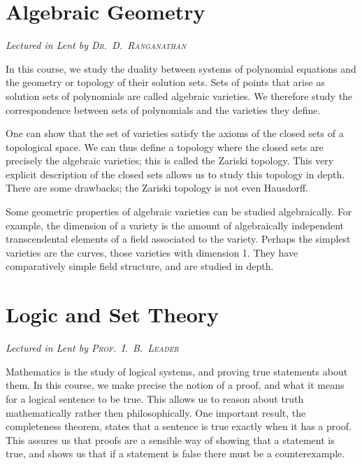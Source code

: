 

\chapter[Algebraic Geometry \\ \textnormal{\emph{Lectured in Lent \oldstylenums{2023} by \textsc{Dr.\ D.\ Ranganathan}}}]{Algebraic Geometry}
\emph{\Large Lectured in Lent  by \textsc{Dr.\ D.\ Ranganathan}}

In this course, we study the duality between systems of polynomial equations and the geometry or topology of their solution sets.
Sets of points that arise as solution sets of polynomials are called algebraic varieties.
We therefore study the correspondence between sets of polynomials and the varieties they define.

One can show that the set of varieties satisfy the axioms of the closed sets of a topological space.
We can thus define a topology where the closed sets are precisely the algebraic varieties; this is called the Zariski topology.
This very explicit description of the closed sets allows us to study this topology in depth.
There are some drawbacks; the Zariski topology is not even Hausdorff.

Some geometric properties of algebraic varieties can be studied algebraically.
For example, the dimension of a variety is the amount of algebraically independent transcendental elements of a field associated to the variety.
Perhaps the simplest varieties are the curves, those varieties with dimension 1.
They have comparatively simple field structure, and are studied in depth.



\chapter[Logic and Set Theory \\ \textnormal{\emph{Lectured in Lent \oldstylenums{2023} by \textsc{Prof.\ I.\ B.\ Leader}}}]{Logic and Set Theory}
\emph{\Large Lectured in Lent  by \textsc{Prof.\ I.\ B.\ Leader}}

Mathematics is the study of logical systems, and proving true statements about them.
In this course, we make precise the notion of a proof, and what it means for a logical sentence to be true.
This allows us to reason about truth mathematically rather then philosophically.
One important result, the completeness theorem, states that a sentence is true exactly when it has a proof.
This assures us that proofs are a sensible way of showing that a statement is true, and shows us that if a statement is false there must be a counterexample.

